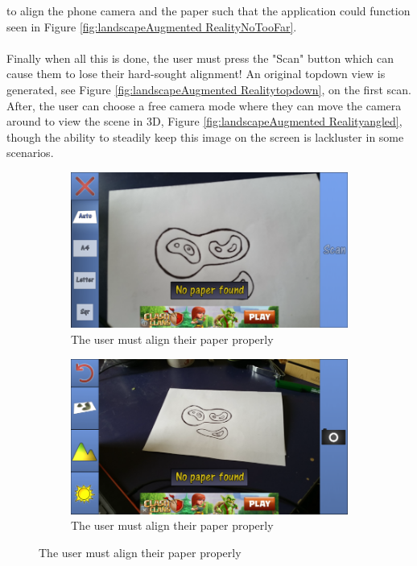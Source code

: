 \documentclass[11pt]{article}
\begin{document}
to align the phone camera and the paper such that the application could 
function seen in Figure \ref{fig:landscapeAugmented RealityNoTooFar}.\\
\\ 
Finally when all this is done, the user must press the "Scan" button
which can cause them to lose their hard-sought alignment! An original
topdown view is generated, see Figure \ref{fig:landscapeAugmented Realitytopdown}, on
the first scan. After, the user can choose a free camera mode where they 
can move the camera around to view the scene in 3D, 
Figure \ref{fig:landscapeAugmented Realityangled}, though the ability to steadily
keep this image on the screen is lackluster in some scenarios.  \\

\begin{figure}[!ht]
	\centering
	\begin{subfigure}[t]{.4\textwidth}
		\centering
		\includegraphics[scale=0.3]{pics/landscapeARNoPaper.png}
		\caption{The user must align their paper properly}
		\label{fig:landscapeAugmented RealityNoPaper1}
	\end{subfigure}
	\hfill
	\begin{subfigure}[t]{.4\textwidth}
		\centering
		\includegraphics[scale=0.3]{pics/landscapeARNoPaper2.png}
		\caption{The user must align their paper properly}
		\label{fig:landscapeAugmented RealityNoPaper2}
	\end{subfigure}
	

\end{figure}
\end{document}
